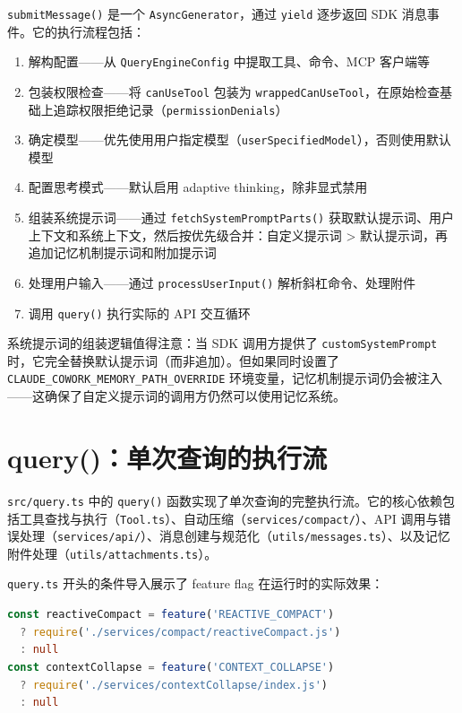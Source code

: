 \texttt{submitMessage()} 是一个 \texttt{AsyncGenerator}，通过 \texttt{yield} 逐步返回 SDK 消息事件。它的执行流程包括：

\begin{enumerate}
  \item 解构配置——从 \texttt{QueryEngineConfig} 中提取工具、命令、MCP 客户端等
  \item 包装权限检查——将 \texttt{canUseTool} 包装为 \texttt{wrappedCanUseTool}，在原始检查基础上追踪权限拒绝记录（\texttt{permissionDenials}）
  \item 确定模型——优先使用用户指定模型（\texttt{userSpecifiedModel}），否则使用默认模型
  \item 配置思考模式——默认启用 adaptive thinking，除非显式禁用
  \item 组装系统提示词——通过 \texttt{fetchSystemPromptParts()} 获取默认提示词、用户上下文和系统上下文，然后按优先级合并：自定义提示词 > 默认提示词，再追加记忆机制提示词和附加提示词
  \item 处理用户输入——通过 \texttt{processUserInput()} 解析斜杠命令、处理附件
  \item 调用 \texttt{query()} 执行实际的 API 交互循环
\end{enumerate}

系统提示词的组装逻辑值得注意：当 SDK 调用方提供了 \texttt{customSystemPrompt} 时，它完全替换默认提示词（而非追加）。但如果同时设置了 \texttt{CLAUDE\_COWORK\_MEMORY\_PATH\_OVERRIDE} 环境变量，记忆机制提示词仍会被注入——这确保了自定义提示词的调用方仍然可以使用记忆系统。

\section{query()：单次查询的执行流}

\texttt{src/query.ts} 中的 \texttt{query()} 函数实现了单次查询的完整执行流。它的核心依赖包括工具查找与执行（\texttt{Tool.ts}）、自动压缩（\texttt{services/compact/}）、API 调用与错误处理（\texttt{services/api/}）、消息创建与规范化（\texttt{utils/messages.ts}）、以及记忆附件处理（\texttt{utils/attachments.ts}）。

\texttt{query.ts} 开头的条件导入展示了 feature flag 在运行时的实际效果：

\begin{lstlisting}[language=TypeScript]
const reactiveCompact = feature('REACTIVE_COMPACT')
  ? require('./services/compact/reactiveCompact.js')
  : null
const contextCollapse = feature('CONTEXT_COLLAPSE')
  ? require('./services/contextCollapse/index.js')
  : null
\end{lstlisting}

